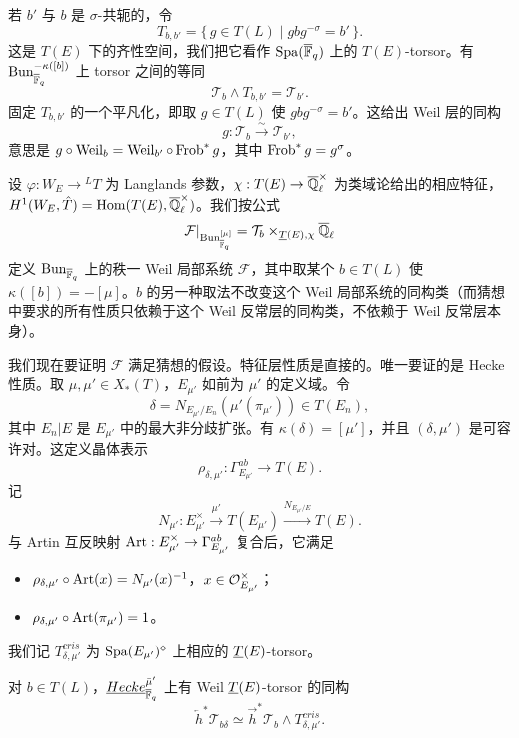 若 $b'$ 与 $b$ 是 $\sigma$-共轭的，令
\[
T_{b,b'} = \{\, g \in T(L) \mid gbg^{-\sigma} = b' \,\}.
\]
这是 $T(E)$ 下的齐性空间，我们把它看作 $\mathrm{Spa}(\overline{\mathbb{F}}_q)$ 上的 $T(E)$-torsor。有 $\mathrm{Bun}^{-\kappa([b])}_{\overline{\mathbb{F}}_q}$ 上 torsor 之间的等同
\[
\mathcal{T}_b \wedge T_{b,b'} = \mathcal{T}_{b'} .
\]
固定 $T_{b,b'}$ 的一个平凡化，即取 $g \in T(L)$ 使 $gbg^{-\sigma} = b'$。这给出 Weil 层的同构
\[
g : \mathcal{T}_b \xrightarrow{\sim} \mathcal{T}_{b'},
\]
意思是 $g \circ \operatorname{Weil}_b = \operatorname{Weil}_{b'} \circ \operatorname{Frob}^* g$，其中 $\operatorname{Frob}^* g = g^\sigma$。

设 $\varphi : W_E \to {}^L T$ 为 Langlands 参数，$\chi : T(E) \to \overline{\mathbb{Q}}_\ell^\times$ 为类域论给出的相应特征，$H^1(W_E, \hat{T}) = \operatorname{Hom}(T(E), \overline{\mathbb{Q}}_\ell^\times)$。我们按公式
\[
\mathcal{F}|_{\mathrm{Bun}^{[\mu]}_{\overline{\mathbb{F}}_q}} = \mathcal{T}_b \times_{\underline{T}(E),\chi} \overline{\mathbb{Q}}_\ell
\]
定义 $\mathrm{Bun}_{\overline{\mathbb{F}}_q}$ 上的秩一 Weil 局部系统 $\mathcal{F}$，其中取某个 $b \in T(L)$ 使 $\kappa([b]) = -[\mu]$。$b$ 的另一种取法不改变这个 Weil 局部系统的同构类（而猜想中要求的所有性质只依赖于这个 Weil 反常层的同构类，不依赖于 Weil 反常层本身）。

我们现在要证明 $\mathcal{F}$ 满足猜想的假设。特征层性质是直接的。唯一要证的是 Hecke 性质。取 $\mu, \mu' \in X_*(T)$，$E_{\mu'}$ 如前为 $\mu'$ 的定义域。令
\[
\delta = N_{E_{\mu'}/E_n}(\mu'(\pi_{\mu'})) \in T(E_n),
\]
其中 $E_n|E$ 是 $E_{\mu'}$ 中的最大非分歧扩张。有 $\kappa(\delta) = [\mu']$，并且 $(\delta, \mu')$ 是可容许对。这定义晶体表示
\[
\rho_{\delta,\mu'} : \Gamma^{ab}_{E_{\mu'}} \to T(E).
\]
记
\[
N_{\mu'} : E^\times_{\mu'} \xrightarrow{\mu'} T(E_{\mu'}) \xrightarrow{N_{E_{\mu'}/E}} T(E).
\]
与 Artin 互反映射 $\operatorname{Art} : E^\times_{\mu'} \to \Gamma^{ab}_{E_{\mu'}}$ 复合后，它满足
\begin{itemize}[leftmargin=*]
\item $\rho_{\delta,\mu'} \circ \operatorname{Art}(x) = N_{\mu'}(x)^{-1}$，$x \in \mathcal{O}^\times_{E_{\mu'}}$；
\item $\rho_{\delta,\mu'} \circ \operatorname{Art}(\pi_{\mu'}) = 1$。
\end{itemize}
我们记 $T^{cris}_{\delta,\mu'}$ 为 $\mathrm{Spa}(E_{\mu'})^\diamond$ 上相应的 $\underline{T}(E)$-torsor。

\begin{proposition}\label{prop:9.5}
对 $b \in T(L)$，$\underline{Hecke}^{\bar\mu'}_{\overline{\mathbb{F}}_q}$ 上有 Weil $\underline{T}(E)$-torsor 的同构
\[
\overleftarrow{h}^* \mathcal{T}_{b\delta} \simeq \vec{h}^* \mathcal{T}_b \wedge T^{cris}_{\delta,\mu'} .
\]
\end{proposition}


